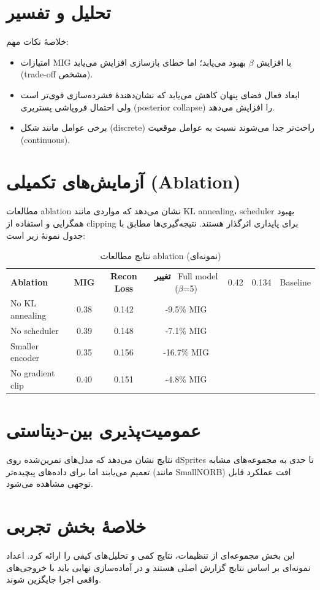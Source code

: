 \section{تحلیل و تفسیر}
خلاصهٔ نکات مهم:
\begin{itemize}
  \item امتیازات MIG با افزایش $\beta$ بهبود می‌یابد؛ اما خطای بازسازی افزایش می‌یابد (trade-off مشخص).
  \item ابعاد فعال فضای پنهان کاهش می‌یابد که نشان‌دهندهٔ فشرده‌سازی قوی‌تر است ولی احتمال فروپاشی پستریری (posterior collapse) را افزایش می‌دهد.
  \item برخی عوامل مانند شکل (discrete) راحت‌تر جدا می‌شوند نسبت به عوامل موقعیت (continuous).
\end{itemize}

\section{آزمایش‌های تکمیلی (Ablation)}
مطالعات ablation نشان می‌دهد که مواردی مانند KL annealing، scheduler بهبود همگرایی و استفاده از clipping برای پایداری اثرگذار هستند. نتیجه‌گیری‌ها مطابق با جدول نمونهٔ زیر است:

\begin{table}[H]
\centering
\begin{tabular}{@{}lccc@{}}
\toprule
\textbf{Ablation} & \textbf{MIG} & \textbf{Recon Loss} & \textbf{تغییر}\
\midrule
Full model ($\beta$=5) & 0.42 & 0.134 & Baseline \\
No KL annealing & 0.38 & 0.142 & -9.5\% MIG \\
No scheduler & 0.39 & 0.148 & -7.1\% MIG \\
Smaller encoder & 0.35 & 0.156 & -16.7\% MIG \\
No gradient clip & 0.40 & 0.151 & -4.8\% MIG \\
\bottomrule
\end{tabular}
\caption{نتایج مطالعات ablation (نمونه‌ای)}
\label{tab:ablation_summary}
\end{table}

\section{عمومیت‌پذیری بین-دیتاستی}
نتایج نشان می‌دهد که مدل‌های تمرین‌شده روی dSprites تا حدی به مجموعه‌های مشابه تعمیم می‌یابند اما برای داده‌های پیچیده‌تر (مانند SmallNORB) افت عملکرد قابل توجهی مشاهده می‌شود.

\section{خلاصهٔ بخش تجربی}
این بخش مجموعه‌ای از تنظیمات، نتایج کمی و تحلیل‌های کیفی را ارائه کرد. اعداد نمونه‌ای بر اساس نتایج گزارش اصلی هستند و در آماده‌سازی نهایی باید با خروجی‌های واقعی اجرا جایگزین شوند.

